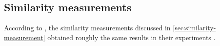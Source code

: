 \subsection*{Similarity measurements}\label{subsec:evaluation-sim-measurements}

According to \citeauthor{HfsentTrans2019}, the similarity measurements discussed in \autoref{sec:similarity-measurement} obtained roughly the same results in their experiments \cite{HfsentTrans2019}.   
